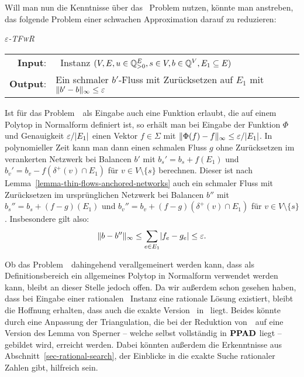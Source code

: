 Will man nun die Kenntnisse über das \Brouwer\ Problem nutzen, könnte man anstreben, das folgende Problem einer schwachen Approximation darauf zu reduzieren:

\newcommand{\epsTFwR}{\textsc{$\varepsilon$-TFwR}}
\begin{center}
	\begin{mdframed}
		\centering
		\emph{\epsTFwR} \\[1em]
		\begin{tabular}{rl}
			{\bfseries Input}: &\problemThinFlow\ Instanz $(V, E, u \in \mathbb{Q}^E_{>0}, s\in V, b\in \mathbb{Q}^V, E_1\subseteq E)$\\
			{\bfseries Output}: &Ein schmaler $b'$-Fluss mit Zurücksetzen auf $E_1$ mit $\lVert b' - b\rVert_\infty \leq \varepsilon$
		\end{tabular}
	\end{mdframed}
\end{center}

Ist für das Problem~\Brouwer\ als Eingabe auch eine Funktion erlaubt, die auf einem Polytop in Normalform definiert ist, so erhält man bei Eingabe der Funktion $\Phi$ und Genauigkeit $\varepsilon/\lvert E_1\rvert$ einen Vektor $f\in\Sigma$ mit $\lVert\Phi(f) - f\rVert_\infty \leq \varepsilon / \lvert E_1\rvert$.
In polynomieller Zeit kann man dann einen schmalen Fluss $g$ ohne Zurücksetzen im verankerten Netzwerk bei Balancen $b'$ mit $b_s' = b_s + f(E_1)$ und $b_v' = b_v - f(\delta^+(v)\cap E_1)$ für $v\in V\setminus\{ s \}$ berechnen.
Dieser ist nach Lemma~\ref{lemma-thin-flows-anchored-networks} auch ein schmaler Fluss mit Zurücksetzen im ursprünglichen Netzwerk bei Balancen $b''$ mit $b_s'' = b_s + (f-g)(E_1)$ und $b_v'' = b_v + (f-g)(\delta^+(v)\cap E_1)$ für $v\in V\setminus\{s\}$.
Insbesondere gilt also:
\[ 
	\lVert b - b''\rVert_\infty \leq \sum_{e \in E_1} \lvert f_e - g_e\rvert \leq \varepsilon.
\]

Ob das Problem~\Brouwer\ dahingehend verallgemeinert werden kann, dass als Definitionsbereich ein allgemeines Polytop in Normalform verwendet werden kann, bleibt an dieser Stelle jedoch offen.
Da wir außerdem schon gesehen haben, dass bei Eingabe einer rationalen \problemThinFlow\ Instanz eine rationale Lösung existiert, bleibt die Hoffnung erhalten, dass auch die exakte Version \probTFwR\ in \PPAD\ liegt.
Beides könnte durch eine Anpassung der Triangulation, die bei der Reduktion von~\Brouwer\ auf eine Version des Lemma von Sperner -- welche selbst vollständig in $\textbf{PPAD}$ liegt -- gebildet wird, erreicht werden.
Dabei könnten außerdem die Erkenntnisse aus Abschnitt~\ref{sec-rational-search}, der Einblicke in die exakte Suche rationaler Zahlen gibt, hilfreich sein.